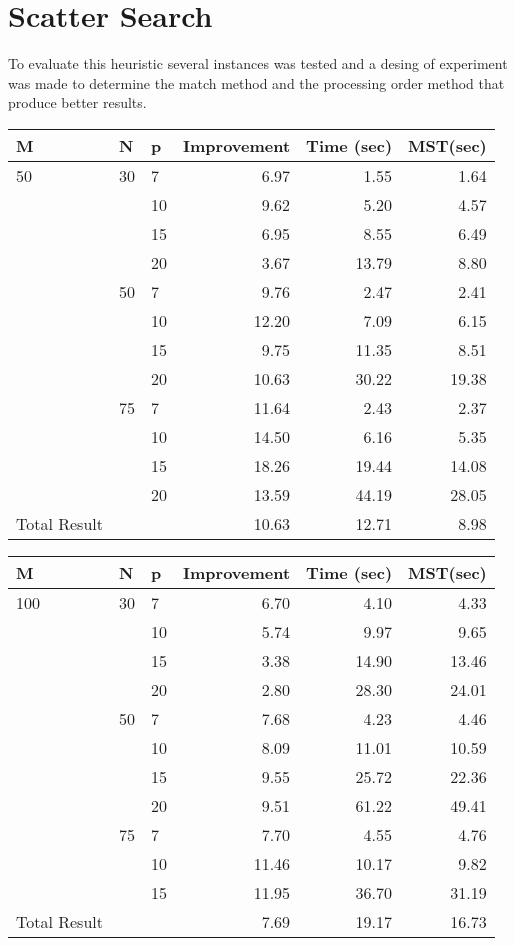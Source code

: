 \section{Scatter Search}
To evaluate this heuristic
several instances was tested
and
a desing of experiment was made
to determine
the match method
and the processing order method
that produce better results.

\begin{center}
  \begin{tabular}{|l|l|l|r|r|r|}
    \hline
    M & N & p & Improvement & Time (sec) & MST(sec) \\ \hline
    50 & 30 & 7 & 6.97 & 1.55 & 1.64 \\
    &  & 10 & 9.62 & 5.20 & 4.57 \\
    &  & 15 & 6.95 & 8.55 & 6.49 \\
    &  & 20 & 3.67 & 13.79 & 8.80 \\ \cline{2-6}
    & 50 & 7 & 9.76 & 2.47 & 2.41 \\
    &  & 10 & 12.20 & 7.09 & 6.15 \\
    &  & 15 & 9.75 & 11.35 & 8.51 \\
    &  & 20 & 10.63 & 30.22 & 19.38 \\ \cline{2-6}
    & 75 & 7 & 11.64 & 2.43 & 2.37 \\
    &  & 10 & 14.50 & 6.16 & 5.35 \\
    &  & 15 & 18.26 & 19.44 & 14.08 \\
    &  & 20 & 13.59 & 44.19 & 28.05 \\ \hline
    Total Result &  &  & 10.63 & 12.71 & 8.98 \\ 
    \hline
  \end{tabular}
\end{center}

\begin{center}
  \begin{tabular}{|l|l|l|r|r|r|}
    \hline
    M & N & p & Improvement & Time (sec) & MST(sec) \\ \hline
    100 & 30 & 7 & 6.70 & 4.10 & 4.33 \\
    &  & 10 & 5.74 & 9.97 & 9.65 \\
    &  & 15 & 3.38 & 14.90 & 13.46 \\
    &  & 20 & 2.80 & 28.30 & 24.01 \\ \cline{2-6}
    & 50 & 7 & 7.68 & 4.23 & 4.46 \\
    &  & 10 & 8.09 & 11.01 & 10.59 \\
    &  & 15 & 9.55 & 25.72 & 22.36 \\
    &  & 20 & 9.51 & 61.22 & 49.41 \\ \cline{2-6}
    & 75 & 7 & 7.70 & 4.55 & 4.76 \\
    &  & 10 & 11.46 & 10.17 & 9.82 \\
    &  & 15 & 11.95 & 36.70 & 31.19 \\ \hline
    Total Result &  &  & 7.69 & 19.17 & 16.73 \\ 
    \hline
  \end{tabular}
\end{center}

